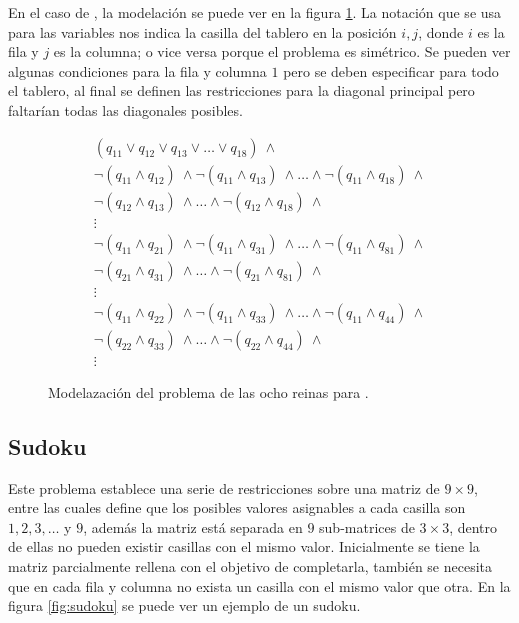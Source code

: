 En el caso de \sat, la modelación se puede ver en la figura \ref{fig:queens_sat}. La notación que se usa para las variables nos indica la casilla del tablero en la posición $i,j$, donde $i$ es la fila y $j$ es la columna; o vice versa porque el problema es simétrico. Se pueden ver algunas condiciones para la fila y columna $1$ pero se deben especificar para todo el tablero, al final se definen las restricciones para la diagonal principal pero faltarían todas las diagonales posibles.

\begin{figure}
\begin{align*}
    (q_{11} \lor q_{12} \lor q_{13}\lor\dots\lor q_{18})\ \land\\
    \neg(q_{11} \land q_{12})\ \land\neg(q_{11} \land q_{13})\ \land\dots\land\neg(q_{11} \land q_{18})\ \land\\
    \neg(q_{12} \land q_{13})\ \land\dots\land\neg(q_{12} \land q_{18})\ \land\\
    \vdots\\
    \neg(q_{11} \land q_{21})\ \land\neg(q_{11} \land q_{31})\ \land\dots\land\neg(q_{11} \land q_{81})\ \land\\
    \neg(q_{21} \land q_{31})\ \land\dots\land\neg(q_{21} \land q_{81})\ \land\\
    \vdots\\
    \neg(q_{11} \land q_{22})\ \land\neg(q_{11} \land q_{33})\ \land\dots\land\neg(q_{11} \land q_{44})\ \land\\
    \neg(q_{22} \land q_{33})\ \land\dots\land\neg(q_{22} \land q_{44})\ \land\\
    \vdots
\end{align*}
\caption{Modelazación del problema de las ocho reinas para \sat.}
\label{fig:queens_sat}
\end{figure}

\subsection{Sudoku}

Este problema establece una serie de restricciones sobre una matriz de $9\times9$, entre las cuales define que los posibles valores asignables a cada casilla son $1, 2, 3, \dots$ y $9$, además la matriz está separada en $9$ sub-matrices de $3\times 3$, dentro de ellas no pueden existir casillas con el mismo valor. Inicialmente se tiene la matriz parcialmente rellena con el objetivo de completarla, también se necesita que en cada fila y columna no exista un casilla con el mismo valor que otra. En la figura \ref{fig:sudoku} se puede ver un ejemplo de un sudoku.


